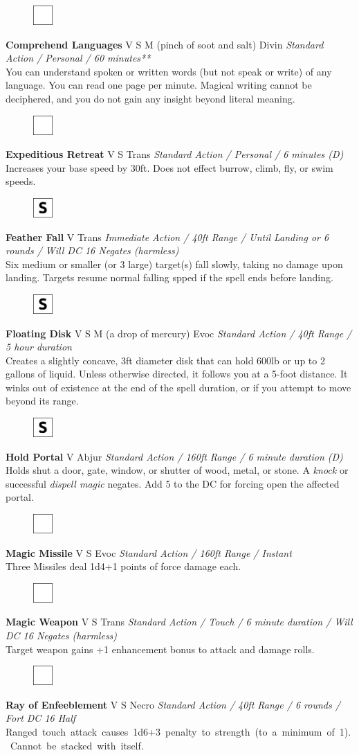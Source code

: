 \documentclass[letterpaper]{article}
\newcommand{\spell}[7]{
\begin{figure}
\vspace{-13pt}
\ifstrequal{#2}{Full}{  \includegraphics[width=2em]{Checkbox-Full}}{
\ifstrequal{#2}{Scroll}{\includegraphics[width=2em]{Checkbox-S}}{
                        \includegraphics[width=2em]{Checkbox}}}
\ifstrequal{#7}{}{\vspace{-1em}}{\vspace{#7}}
\end{figure}
\noindent \textbf{#1} #3 {
    \ifstrequal{#4}{Conj}{\color{Plum}Conj}{%
    \ifstrequal{#4}{Divin}{\color{YellowOrange}Divin}{%
    \ifstrequal{#4}{Ench}{\color{VioletRed}Ench}{%
    \ifstrequal{#4}{Trans}{\color{LimeGreen}Trans}{%
    \ifstrequal{#4}{Evoc}{\color{RedOrange}Evoc}{%
    \ifstrequal{#4}{Illu}{\color{ProcessBlue}Illu}{%
    \ifstrequal{#4}{Abjur}{\color{CadetBlue}Abjur}{%
    \ifstrequal{#4}{Necro}{\color{Red}Necro}{%
}}}}}}}}}
{\footnotesize \emph{#5}} \\
#6
}
\begin{document}
\spell{Comprehend Languages}{}{V S M (pinch of soot and salt)}{Divin}{Standard Action / Personal / 60 minutes**}{%
You can understand spoken or written words (but not speak or write) of any language. You can read one page per minute. Magical writing cannot be deciphered, and you do not gain any insight beyond literal meaning.}{} %

\spell{Expeditious Retreat}{}{V S}{Trans}{Standard Action / Personal / 6 minutes (D)}{%
Increases your base speed by 30ft.  Does not effect burrow, climb, fly, or swim speeds.}{}\\[-1em] %

\spell{Feather Fall}{Scroll}{V}{Trans}{Immediate Action / 40ft Range / Until Landing or 6 rounds / Will DC 16 Negates (harmless)}{%
Six medium or smaller (or 3 large) target(s) fall slowly, taking no damage upon landing. Targets resume normal falling spped if the spell ends before landing.}{} %

\spell{Floating Disk}{Scroll}{V S M (a drop of mercury)}{Evoc}{Standard Action / 40ft Range / 5 hour duration}{%
Creates a slightly concave, 3ft diameter disk that can hold 600lb or up to 2 gallons of liquid. Unless otherwise directed, it follows you at a 5-foot distance.  It winks out of existence at the end of the spell duration, or if you attempt to move beyond its range.}{0em} %

\spell{Hold Portal}{Scroll}{V}{Abjur}{Standard Action / 160ft Range / 6 minute duration (D)}{%
Holds shut a door, gate, window, or shutter of wood, metal, or stone.  A \emph{knock} or successful \emph{dispell magic} negates. Add 5 to the DC for forcing open the affected portal.}{} %

\spell{Magic Missile}{}{V S}{Evoc}{Standard Action / 160ft Range / Instant}{%
Three Missiles deal 1d4+1 points of force damage each.}{} \\[-1em] %

\spell{Magic Weapon}{}{V S}{Trans}{Standard Action / Touch / 6 minute duration / Will DC 16 Negates \mbox{(harmless)}}{%
Target weapon gains +1 enhancement bonus to attack and damage rolls.}{}\\[-1em] %

\spell{Ray of Enfeeblement}{}{V S}{Necro}{Standard Action / 40ft Range / 6 rounds / Fort DC 16 Half}{%
\mbox{Ranged touch attack causes 1d6+3 penalty to strength (to a minimum of 1).  Cannot be stacked with itself.}}{} \\[-1em] %
\end{document}
